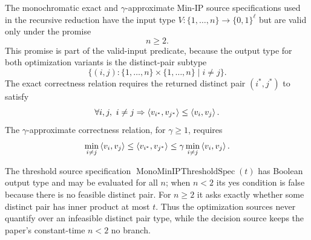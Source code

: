 \begin{definition}
  \label{def:promised-monochromatic-minip-source-specs}
  The monochromatic exact and $\gamma$-approximate Min-IP source specifications
  used in the recursive reduction have the input type
  $V:\{1,\ldots,n\}\to\{0,1\}^{\ell}$ but are valid only under the promise
  \[
    n\geq2.
  \]
  This promise is part of the valid-input predicate, because the output type
  for both optimization variants is the distinct-pair subtype
  \[
    \{(i,j):\{1,\ldots,n\}\times\{1,\ldots,n\}\mid i\neq j\}.
  \]
  The exact correctness relation requires the returned distinct pair
  $(i^*,j^*)$ to satisfy
  \[
    \forall i,j,\ i\neq j\Rightarrow
      \left\langle v_{i^*},v_{j^*}\right\rangle\leq\left\langle v_i,v_j\right\rangle.
  \]
  The $\gamma$-approximate correctness relation, for $\gamma\geq1$, requires
  \[
    \min_{i\neq j}\left\langle v_i,v_j\right\rangle
      \leq \left\langle v_{i^*},v_{j^*}\right\rangle
      \leq \gamma\min_{i\neq j}\left\langle v_i,v_j\right\rangle.
  \]

  The threshold source specification
  $\operatorname{MonoMinIPThresholdSpec}(t)$ has Boolean output type and may be
  evaluated for all $n$; when $n<2$ its yes condition is false because there is
  no feasible distinct pair.  For $n\geq2$ it asks exactly whether some
  distinct pair has inner product at most $t$.
  Thus the optimization sources never quantify over an infeasible distinct
  pair type, while the decision source keeps the paper's constant-time
  $n<2$ no branch.
\end{definition}

